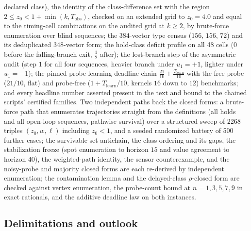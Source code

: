\documentclass[10pt,twocolumn]{article}
\theoremstyle{plain}
\theoremstyle{definition}
\theoremstyle{remark}
\begin{document}
declared class), the identity of the class-difference set with the region
\(2 \le z_{0} < 1 + \min(k, T_{\mathrm{obs}})\), checked on an
extended grid to \(z_{0} = 4.0\) and equal to the timing-cell
combinations on the audited grid at \(k \ge 2\), by brute-force
enumeration over blind sequences; the \(384\)-vector type census
(\(156\), \(156\), \(72\)) and its deduplicated \(348\)-vector
form; the hold-class deficit profile on all 48 cells (\(0\) before the
falling-branch exit, \(\tfrac{1}{2}\) after); the lost-branch step of
the asymmetric audit (step \(1\) for all four sequences, heavier
branch under \(u_{1} = +1\), lighter under \(u_{1} = -1\)); the
pinned-probe learning-deadline chain
\(\tfrac{21}{10} + \tfrac{T_{\mathrm{learn}}}{10}\) with the
free-probe (\(21/10\), flat) and probe-free
(\(1 + T_{\mathrm{learn}}/10\), kernels \(16\) down to \(12\))
benchmarks; and every headline
number asserted present in the text and bound to the chained scripts'
certified families. Two independent paths back the closed forms: a
brute-force path that enumerates trajectories straight from the
definitions (all holds and all open-loop sequences, pathwise survival)
over a structured sweep of 2268 triples
\((z_{0}, w, \ell)\) including \(z_{0} < 1\), and a seeded
randomized battery of 500 further cases; the survivable-set antichain,
the class ordering and its gaps, the stabilization freeze (spot
enumeration to horizon \(15\) and value agreement to horizon
\(40\)), the weighted-path identity, the sensor counterexample, and
the noisy-probe and majority closed forms are each re-derived by
independent enumeration; the contamination lemma and the delayed-class
\(\rho\)-closed form are checked against vertex enumeration, the
probe-count bound at \(n = 1, 3, 5, 7, 9\) in exact rationals, and the
additive deadline law on both instances.

\subsection{Delimitations and outlook}\label{scope}
\end{document}
